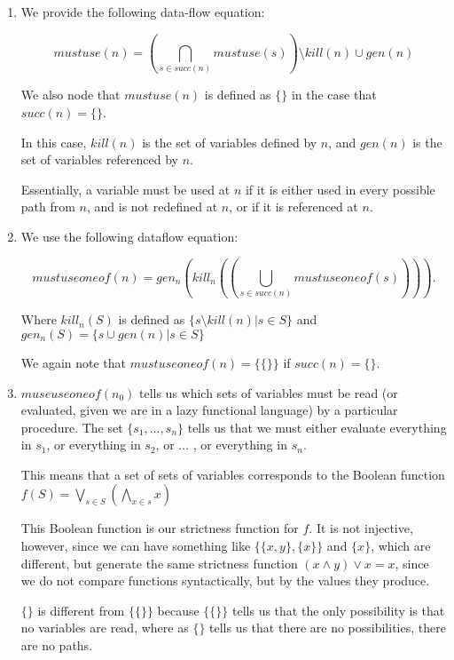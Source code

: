 


\begin{enumerate}[label=(\alph*)]
  \item
    We provide the following data-flow equation:

    \[
      mustuse(n) = \left(\bigcap_{s \in succ(n)} mustuse(s)\right) \setminus kill(n) \cup gen(n)
    \]

    We also node that $mustuse(n)$ is defined as $\{\}$ in the case that $succ(n) = \{\}$.

    In this case, $kill(n)$ is the set of variables defined by $n$, and $gen(n)$ is the set of variables referenced by $n$.

    Essentially, a variable must be used at $n$ if it is either used in every possible path from $n$, and is not redefined at $n$, or if it is referenced at $n$.

  \item
    We use the following dataflow equation:

    \[
      mustuseoneof(n) = gen_n(kill_n(\left(\bigcup_{s \in succ(n)} mustuseoneof(s)\right)))
    .\] 

    Where $kill_n(S)$ is defined as $\{s \setminus kill(n) | s \in S\}$ and $gen_n(S) = \{s \cup gen(n) | s \in S\}$

    We again note that $mustuseoneof(n) = \{\{\}\}$ if $succ(n) = \{\}$.

  \item
    $museuseoneof(n_0)$ tells us which sets of variables must be read (or evaluated, given we are in a lazy functional language) by a particular procedure. The set $\{s_1, \ldots, s_n\}$ tells us that we must either evaluate everything in $s_1$, or everything in $s_2$, or $\ldots$ , or everything in $s_n$.

    This means that a set of sets of variables corresponds to the Boolean function $f(S) = \bigvee_{s \in S} (\bigwedge_{x \in s} x)$

    This Boolean function is our strictness function for $f$. It is not injective, however, since we can have something like $\{\{x,y\}, \{x\}\}$ and $\{x\}$, which are different, but generate the same strictness function $(x \wedge y) \vee x = x$, since we do not compare functions syntactically, but by the values they produce.

    $\{\}$ is different from $\{\{\}\}$ because $\{\{\}\}$ tells us that the only possibility is that no variables are read, where as $\{\}$ tells us that there are no possibilities, there are no paths.


\end{enumerate}
